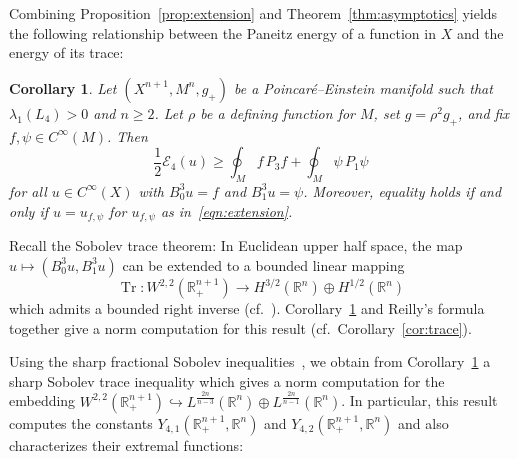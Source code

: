 \documentclass{amsart}
\newtheorem{cor}[thm]{Corollary}
\theoremstyle{definition}
\theoremstyle{remark}
\numberwithin{equation}{section}
\begin{document}
Combining Proposition~\ref{prop:extension} and Theorem~\ref{thm:asymptotics} yields the following relationship between the Paneitz energy of a function in $X$ and the energy of its trace:

\begin{cor}
 \label{cor:l4_sobolev_trace}
 Let $(X^{n+1},M^n,g_+)$ be a Poincar\'e--Einstein manifold such that $\lambda_1(L_4)>0$ and $n\geq2$.  Let $\rho$ be a defining function for $M$, set $g=\rho^2g_+$, and fix $f,\psi\in C^\infty(M)$.  Then
 \[  \frac{1}{2}{\mathcal{E}}_4(u) \geq \oint_M f\,P_3f + \oint_M \psi\,P_1\psi \]
 for all $u\in C^\infty(X)$ with $B_0^3u=f$ and $B_1^3u=\psi$.  Moreover, equality holds if and only if $u=u_{f,\psi}$ for $u_{f,\psi}$ as in~\eqref{eqn:extension}.
\end{cor}

Recall the Sobolev trace theorem: In Euclidean upper half space, the map $u\mapsto (B_0^3u,B_1^3u)$ can be extended to a bounded linear mapping
\[ \operatorname{Tr} \colon W^{2,2}({\mathbb{R}}_+^{n+1}) \to H^{3/2}({\mathbb{R}}^n) \oplus H^{1/2}({\mathbb{R}}^n) \]
which admits a bounded right inverse (cf.\ \cite{Treves1980}).  Corollary~\ref{cor:l4_sobolev_trace} and Reilly's formula~\cite{Reilly1977} together give a norm computation for this result (cf.\ Corollary~\ref{cor:trace}).

Using the sharp fractional Sobolev inequalities~\cite{Beckner1993,Lieb1983}, we obtain from Corollary~\ref{cor:l4_sobolev_trace} a sharp Sobolev trace inequality which gives a norm computation for the embedding $W^{2,2}({\mathbb{R}}_+^{n+1})\hookrightarrow L^{\frac{2n}{n-3}}({\mathbb{R}}^n)\oplus L^{\frac{2n}{n-1}}({\mathbb{R}}^n)$.  In particular, this result computes the constants $Y_{4,1}({\mathbb{R}}_+^{n+1},{\mathbb{R}}^n)$ and $Y_{4,2}({\mathbb{R}}_+^{n+1},{\mathbb{R}}^n)$ and also characterizes their extremal functions:
\end{document}
